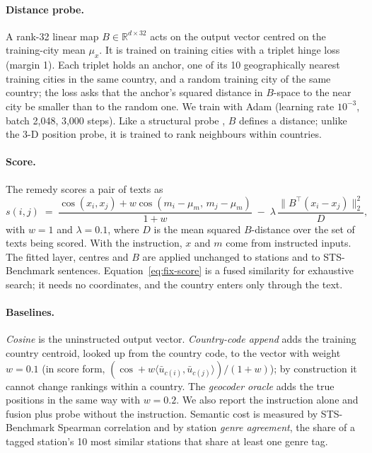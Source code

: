 \paragraph{Distance probe.}
A rank-32 linear map $B\in\mathbb{R}^{d\times 32}$ acts on the output vector centred on the training-city mean $\mu_x$. It is trained on training cities with a triplet hinge loss (margin 1). Each triplet holds an anchor, one of its 10 geographically nearest training cities in the same country, and a random training city of the same country; the loss asks that the anchor's squared distance in $B$-space to the near city be smaller than to the random one. We train with Adam (learning rate $10^{-3}$, batch 2,048, 3,000 steps). Like a structural probe \citep{hewitt2019structural}, $B$ defines a distance; unlike the 3-D position probe, it is trained to rank neighbours within countries.

\paragraph{Score.}
The remedy scores a pair of texts as
\begin{equation}
s(i,j) \;=\; \frac{\cos(x_i,x_j)+w\cos(m_i-\mu_m,\,m_j-\mu_m)}{1+w}\;-\;\lambda\,\frac{\lVert B^{\top}(x_i-x_j)\rVert_2^2}{D},
\label{eq:fix-score}
\end{equation}
with $w=1$ and $\lambda=0.1$, where $D$ is the mean squared $B$-distance over the set of texts being scored. With the instruction, $x$ and $m$ come from instructed inputs. The fitted layer, centres and $B$ are applied unchanged to stations and to STS-Benchmark sentences. Equation~\ref{eq:fix-score} is a fused similarity for exhaustive search; it needs no coordinates, and the country enters only through the text.

\paragraph{Baselines.}
\emph{Cosine} is the uninstructed output vector. \emph{Country-code append} adds the training country centroid, looked up from the country code, to the vector with weight $w=0.1$ (in score form, $(\cos+w\langle\bar u_{c(i)},\bar u_{c(j)}\rangle)/(1+w)$); by construction it cannot change rankings within a country. The \emph{geocoder oracle} adds the true positions in the same way with $w=0.2$. We also report the instruction alone and fusion plus probe without the instruction. Semantic cost is measured by STS-Benchmark Spearman correlation and by station \emph{genre agreement}, the share of a tagged station's 10 most similar stations that share at least one genre tag.

